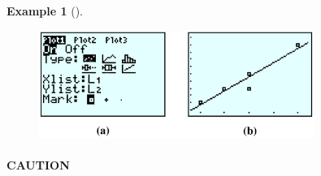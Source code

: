 \documentclass[10pt,]{book}
\theoremstyle{plain}
\theoremstyle{definition}
\theoremstyle{definition}
\newtheorem{example}[theorem]{Example}
\numberwithin{equation}{section}
\begin{document}
\begin{example}[]
\begin{enumerate}[label=*\alph**]
        \leavevmode%
\begin{figure}
\centering
\includegraphics[width=0.80\textwidth,]{images/fig-GC-regression2.svg}\caption{\label{fig-GC-regression2}}
\end{figure}
\end{enumerate}
\end{example}
\typeout{************************************************}
\typeout{************************************************}
\paragraph[CAUTION]{CAUTION}\label{paragraphs-17}
\end{document}
